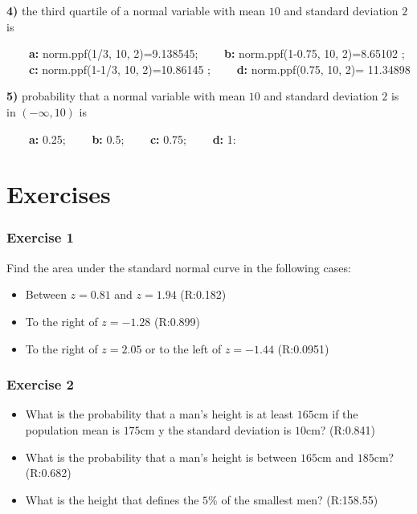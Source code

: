 \documentclass[
]{book}
\providecommand{\tightlist}{%
  \setlength{\itemsep}{0pt}\setlength{\parskip}{0pt}}
\begin{document}
\textbf{4)} the third quartile of a normal variable with mean \(10\) and standard deviation \(2\) is

\textbf{\(\qquad\)a:} norm.ppf(1/3, 10, 2)=9.138545;
\textbf{\(\qquad\)b:} norm.ppf(1-0.75, 10, 2)=8.65102 ;
\textbf{\(\qquad\)c:} norm.ppf(1-1/3, 10, 2)=10.86145 ;
\textbf{\(\qquad\)d:} norm.ppf(0.75, 10, 2)= 11.34898

\textbf{5)} probability that a normal variable with mean \(10\) and standard deviation \(2\) is in \((-\infty,10)\) is

\textbf{\(\qquad\)a:} 0.25;
\textbf{\(\qquad\)b:} 0.5;
\textbf{\(\qquad\)c:} 0.75;
\textbf{\(\qquad\)d:} 1:

\hypertarget{exercises-7}{%
\section{Exercises}\label{exercises-7}}

\hypertarget{exercise-1-6}{%
\subsubsection{Exercise 1}\label{exercise-1-6}}

Find the area under the standard normal curve in the following cases:

\begin{itemize}
\tightlist
\item
  Between \(z=0.81\) and \(z=1.94\) (R:0.182)
\item
  To the right of \(z=-1.28\) (R:0.899)
\item
  To the right of \(z=2.05\) or to the left of \(z=-1.44\) (R:0.0951)
\end{itemize}

\hypertarget{exercise-2-6}{%
\subsubsection{Exercise 2}\label{exercise-2-6}}

\begin{itemize}
\item
  What is the probability that a man's height is at least
  \(165\)cm if the population mean is \(175\)cm y the standard deviation is \(10\)cm? (R:0.841)
\item
  What is the probability that a man's height is between
  \(165\)cm and \(185\)cm? (R:0.682)
\item
  What is the height that defines the \(5\%\) of the smallest men? (R:158.55)
\end{itemize}
\end{document}
